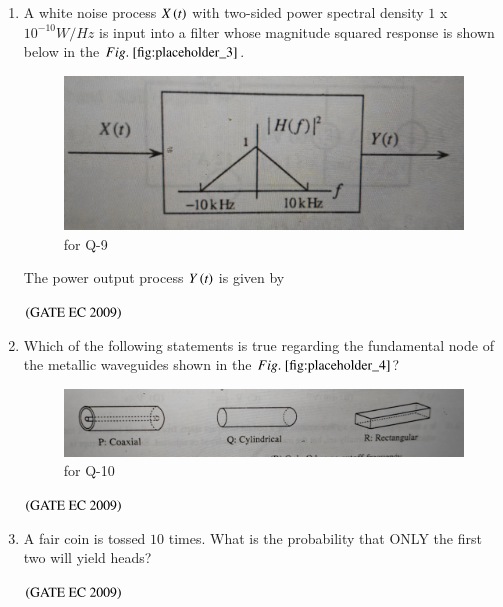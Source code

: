 \documentclass[journal,12pt,onecolumn]{IEEEtran}
\theoremstyle{remark}
\begin{document}
\begin{enumerate}
\item A white noise process $X\brak{t}$ with two-sided power spectral density $1$ x $10^{-10} W/Hz$ is input into a filter whose magnitude squared response is shown below in the $\figref{fig:placeholder_3}$.
\begin{figure}[H]
    \centering
    \includegraphics[width=0.5\columnwidth]{figs/fig_3.jpg}
    \caption{\centering for Q-9}
    \label{fig:placeholder_3}
\end{figure}
The power output process $Y\brak{t}$ is given by 
\begin{enumerate}
\end{enumerate}
\hfill $\brak{\text{GATE EC 2009}}$

\item Which of the following statements is true regarding the fundamental node of the metallic waveguides shown in the $\figref{fig:placeholder_4}$?
\begin{figure}[H]
    \centering
    \includegraphics[width=0.5\columnwidth]{figs/fig_4.jpg}
    \caption{\centering for Q-10}
    \label{fig:placeholder_4}
\end{figure}
\begin{enumerate}
\end{enumerate}
\hfill $\brak{\text{GATE EC 2009}}$

\item A fair coin is tossed $10$ times. What is the probability that ONLY the first two will yield heads?
\begin{enumerate}
\end{enumerate}
\hfill $\brak{\text{GATE EC 2009}}$


\end{enumerate}
\end{document}
